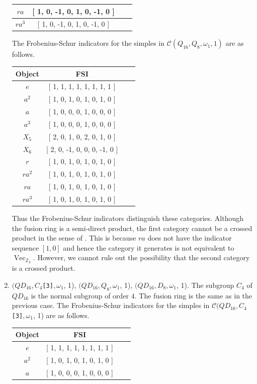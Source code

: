 \documentclass[a4paper, 10pt]{book}
\theoremstyle{definition}
\numberwithin{equation}{chapter}
\newcommand\lstl{\lstinline}
\newcommand\Vect{\operatorname{Vec}}
\newcommand\ZZ{\mathbb Z}
\newcommand\C{\mathcal C}
\begin{document}
\begin{enumerate}
\begin{center}
\begin{tabular}{ | c |c | c | r |}
 $ra$&  [ 1, 0, -1, 0, 1, 0, -1, 0 ]\\
  \hline

 $ra^3$& [ 1, 0, -1, 0, 1, 0, -1, 0 ]\\
  \hline

   
  \end{tabular}
\end{center}
 The Frobenius-Schur indicators for the simples in $\C(Q_{16}, Q_8, \omega_1, 1)$ are as follows.
\begin{center}
\begin{tabular}{ | c |c | c | r |}
\hline
Object & FSI\\
\hline
$e$ &[ 1, 1, 1, 1, 1, 1, 1, 1 ]\\
\hline
 $a^2$&[ 1, 0, 1, 0, 1, 0, 1, 0 ]\\
\hline
 $a$& [ 1, 0, 0, 0, 1, 0, 0, 0 ]\\
  \hline
   
 $a^3$ &[ 1, 0, 0, 0, 1, 0, 0, 0 ]\\
  \hline
$X_5$&  [ 2, 0, 1, 0, 2, 0, 1, 0 ]\\
  \hline
$ X_6 $&  [ 2, 0, -1, 0, 0, 0, -1, 0 ]\\
  \hline
 $r$& [ 1, 0, 1, 0, 1, 0, 1, 0 ]\\
  \hline
 $ra^2$ & [ 1, 0, 1, 0, 1, 0, 1, 0 ]\\
  \hline
  
 $ra$&  [ 1, 0, 1, 0, 1, 0, 1, 0 ]\\
  \hline

 $ra^3$& [ 1, 0, 1, 0, 1, 0, 1, 0 ]\\
  \hline

   
  \end{tabular}
\end{center}
Thus the Frobenius-Schur indicators distinguish these categories. Although the fusion ring is a semi-direct product, the first category cannot be a crossed product in the sense of \cite[Definition 4.15.5]{EGNO}. This is because $ra$ does not have the indicator sequence $[1, 0]$ and hence the category it generates is not equivalent to $\Vect_{\ZZ_2}$. However, we cannot rule out the possibility that the second category is a crossed product. 

\item  $(QD_{16}, C_4$\lstl{[3]}$, \omega_1$, 1), $(QD_{16}, Q_8, \omega_1$, 1), $(QD_{16}, D_8, \omega_1$, 1). 
The subgroup $C_4$ of $QD_{16}$ is the normal subgroup of order $4$. The fusion ring is the same as in the previous case. The Frobenius-Schur indicators for the simples in $\C(QD_{16}, C_4$\lstl{[3]}$, \omega_1$, 1) are as follows.
\begin{center}
\begin{tabular}{ | c |c | c | r |}
\hline
Object & FSI\\
\hline
$e$ &[ 1, 1, 1, 1, 1, 1, 1, 1 ]\\
\hline
 $a^2$&[ 1, 0, 1, 0, 1, 0, 1, 0 ]\\
\hline
 $a$& [ 1, 0, 0, 0, 1, 0, 0, 0 ]\\
  \hline
   

\end{tabular}
\end{center}
\end{enumerate}
\end{document}
